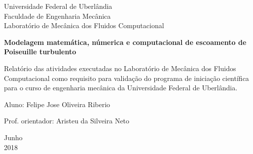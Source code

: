 \begin{titlepage}
	\begin{center}
	

		\Huge{Universidade Federal de Uberlândia}\\
		\large{Faculdade de Engenharia Mecânica}\\ 
		\large{Laboratório de Mecânica dos Fluidos Computacional}\\ 
\vspace{15pt}
        
        \vspace{85pt}
        
		\textbf{\LARGE{Modelagem matemática, númerica e computacional de escoamento de Poiseuille
				turbulento}}
			
	\end{center}
\vspace{1,5cm}
	
	\begin{flushright}

   \begin{list}{}{
      \setlength{\leftmargin}{4.5cm}
      \setlength{\rightmargin}{0cm}
      \setlength{\labelwidth}{0pt}
      \setlength{\labelsep}{\leftmargin}}

      \item Relatório das atividades executadas no Laboratório de Mecânica dos Fluidos Computacional como requisito para validação do programa de iniciação científica para o curso de engenharia mecânica da Universidade Federal de Uberlândia.

      \begin{list}{}{
      \setlength{\leftmargin}{0cm}
      \setlength{\rightmargin}{0cm}
      \setlength{\labelwidth}{0pt}
      \setlength{\labelsep}{\leftmargin}}

			\item Aluno: Felipe Jose Oliveira Riberio \
            \item Prof. orientador: Aristeu da Silveira Neto\

      \end{list}
   \end{list}
\end{flushright}
\vspace{1cm}
\begin{center}
		\vspace{\fill}
		 Junho\\
		 2018
			\end{center}
\end{titlepage}
\newpage
  	   
  	 
  	 \newpage